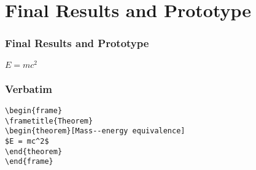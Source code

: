 
\section{Final Results and Prototype}

\begin{frame}
\frametitle{Final Results and Prototype}
\begin{theorem}
$E = mc^2$
\end{theorem}
\end{frame}



\begin{frame}[fragile] %
\frametitle{Verbatim}
\begin{example}
\begin{verbatim}
\begin{frame}
\frametitle{Theorem}
\begin{theorem}[Mass--energy equivalence]
$E = mc^2$
\end{theorem}
\end{frame}\end{verbatim}
\end{example}
\end{frame}


